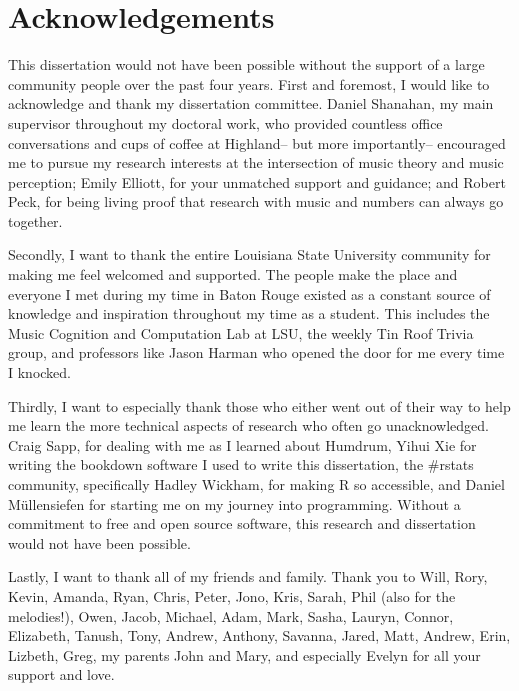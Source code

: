 \documentclass[12pt,]{book}
\begin{document}
\let\cleardoublepage\clearpage

\let\bforigdefault\bfdefault
{}

\pagestyle{plain}
\chapter{Acknowledgements}

This dissertation would not have been possible without the support of a large community people over the past four years.
First and foremost, I would like to acknowledge and thank my dissertation committee.
Daniel Shanahan, my main supervisor throughout my doctoral work, who provided countless office conversations and cups of coffee at Highland-- but more importantly-- encouraged me to pursue my research interests at the intersection of music theory and music perception; Emily Elliott, for your unmatched support and guidance; and Robert Peck, for being living proof that research with music and numbers can always go together.

Secondly, I want to thank the entire Louisiana State University community for making me feel welcomed and supported.
The people make the place and everyone I met during my time in Baton Rouge existed as a constant source of knowledge and inspiration throughout my time as a student.
This includes the Music Cognition and Computation Lab at LSU, the weekly Tin Roof Trivia group, and professors like Jason Harman  who opened the door for me every time I knocked.

Thirdly, I want to especially thank those who either went out of their way to help me learn the more technical aspects of research who often go unacknowledged.
Craig Sapp, for dealing with me as I learned about Humdrum, Yihui Xie for writing the bookdown software I used to write this dissertation, the \#rstats community, specifically Hadley Wickham, for making R so accessible, and Daniel Müllensiefen for starting me on my journey into programming.
Without a commitment to free and open source software, this research and dissertation would not have been possible.

Lastly, I want to thank all of my friends and family.
Thank you to Will, Rory, Kevin, Amanda, Ryan, Chris, Peter, Jono, Kris, Sarah, Phil (also for the melodies!), Owen, Jacob, Michael, Adam, Mark, Sasha, Lauryn, Connor, Elizabeth, Tanush, Tony, Andrew, Anthony, Savanna, Jared, Matt, Andrew, Erin, Lizbeth, Greg, my parents John and Mary, and especially Evelyn for all your support and love.
\end{document}
